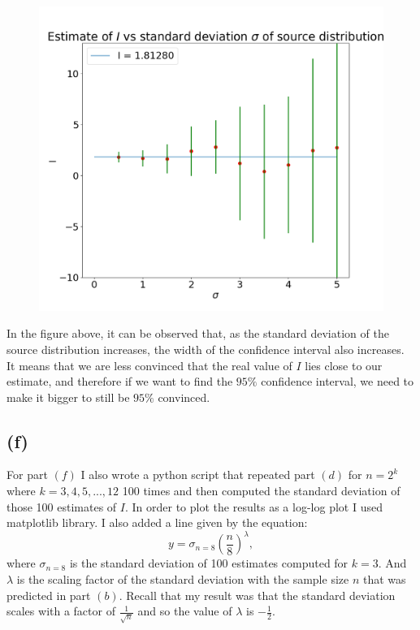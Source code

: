 \documentclass[12pt]{article}
\begin{document}
\begin{figure}[H]
  \begin{center}
    \includegraphics[scale=0.5]{plot1.png}
  \end{center}
\end{figure}

In the figure above, it can be observed that, as the standard deviation of the source distribution increases, the width of the confidence interval also increases. It means that we are less convinced that the real value of $I$ lies close to our estimate, and therefore if we want to find the $95\%$ confidence interval, we need to make it bigger to still be $95\%$
convinced.

\subsection*{(f)}

For part $(f)$ I also wrote a python script that repeated part $(d)$ for $ n = 2^k $ where
$ k = 3, 4, 5, ..., 12 $ 100 times and then computed the standard deviation of those 100 
estimates of $ I $. In order to plot the results as a log-log plot I used matplotlib library. I also added a line given by the equation:
\[ y = \sigma_{n=8} \left( \frac{n}{8} \right)^\lambda,\]
where $\sigma_{n=8}$ is the standard deviation of 100 estimates computed for $ k = 3$. 
And $\lambda$ is the scaling factor of the standard deviation with the sample size $n$ that was predicted in part $(b)$. 
Recall that my result was that the standard deviation scales with a factor of $ \frac{1}{\sqrt{n}} $ and so the value of $ \lambda $ is $ -\frac{1}{2}.$  
\end{document}
